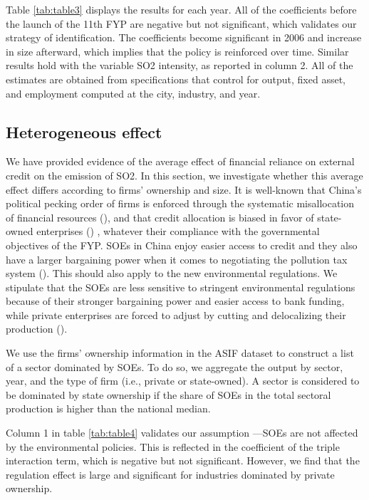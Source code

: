 \documentclass[12pt]{article}
\begin{document}
Table \ref{tab:table3} displays the results for each year. All of the coefficients before the launch of the 11th FYP are negative but not significant, which validates our strategy of identification. The coefficients become significant in 2006 and increase in size afterward, which implies that the policy is reinforced over time. Similar results hold with the variable SO2 intensity, as reported in column 2. All of the estimates are obtained from specifications that control for output, fixed asset, and employment computed at the city, industry, and year.


\subsection{Heterogeneous effect}

We have provided evidence of the average effect of financial reliance on external credit on the emission of SO2. In this section, we investigate whether this average effect differs according to firms’ ownership and size. It is well-known that China's political pecking order of firms is enforced through the systematic misallocation of financial resources (\cite{Dollar2007-dr}), and that credit allocation is biased in favor of state-owned enterprises (\cite{Huang2003-oa, Brandt2003-hu, Ferri2009-lh, Hale2011-ma}) , whatever their compliance with the governmental objectives of the FYP. SOEs in China enjoy easier access to credit and they also have a larger bargaining power when it comes to negotiating the pollution tax system (\cite{Wang2003-ar, Wang2005-yy}). This should also apply to the new environmental regulations. We stipulate that the SOEs are less sensitive to stringent environmental regulations because of their stronger bargaining power and easier access to bank funding, while private enterprises are forced to adjust by cutting and delocalizing their production (\cite{Hering2014-af}).

We use the firms’ ownership information in the ASIF dataset to construct a list of a sector dominated by SOEs. To do so, we aggregate the output by sector, year, and the type of firm (i.e., private or state-owned). A sector is considered to be dominated by state ownership if the share of SOEs in the total sectoral production is higher than the national median.

Column 1 in table \ref{tab:table4} validates our assumption —SOEs are not affected by the environmental policies. This is reflected in the coefficient of the triple interaction term, which is negative but not significant. However, we find that the regulation effect is large and significant for industries dominated by private ownership.
\end{document}
